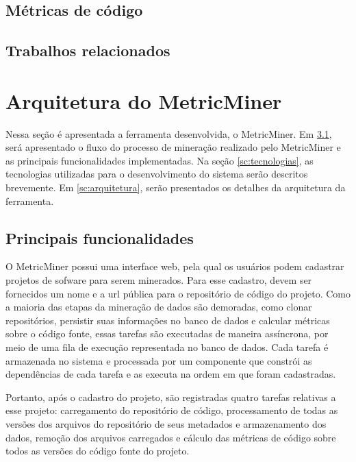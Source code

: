 \documentclass[a4paper, 12pt, twoside]{book}
\begin{document}
    \section{Métricas de código}

    \section{Trabalhos relacionados} \label{ch:trabalhos}
    
\chapter{Arquitetura do MetricMiner} \label{ch:arquitetura}
    Nessa seção é apresentada a ferramenta desenvolvida, o MetricMiner. Em \ref{sc:abordagem}, será apresentado o fluxo do processo de mineração realizado pelo MetricMiner e as principais funcionalidades implementadas. Na seção \ref{sc:tecnologias}, as tecnologias utilizadas para o desenvolvimento do sistema serão descritos brevemente. Em \ref{sc:arquitetura}, serão presentados os detalhes da arquitetura da ferramenta.

    \section{Principais funcionalidades} \label{sc:abordagem}
        O MetricMiner possui uma interface web, pela qual os usuários podem cadastrar projetos de
        sofware para serem minerados. Para esse cadastro, devem ser fornecidos um nome e a url pública para o repositório
        de código do projeto. Como a maioria das etapas da mineração de dados são demoradas, como
        clonar repositórios, persistir suas informações no banco de dados e calcular métricas sobre o
        código fonte, essas tarefas são executadas de maneira assíncrona, por meio 
        de uma fila de execução representada no banco de dados. Cada tarefa é armazenada no sistema e 
        processada por um componente que constrói as dependências de cada tarefa e as executa na 
        ordem em que foram cadastradas.

        Portanto, após o cadastro do projeto, são registradas quatro tarefas relativas a esse 
        projeto: carregamento do repositório de código, processamento de todas as versões
        dos arquivos do repositório de seus metadados e armazenamento dos dados,
        remoção dos arquivos carregados e cálculo das métricas de código sobre todos
        as versões do código fonte do projeto.
\end{document}

